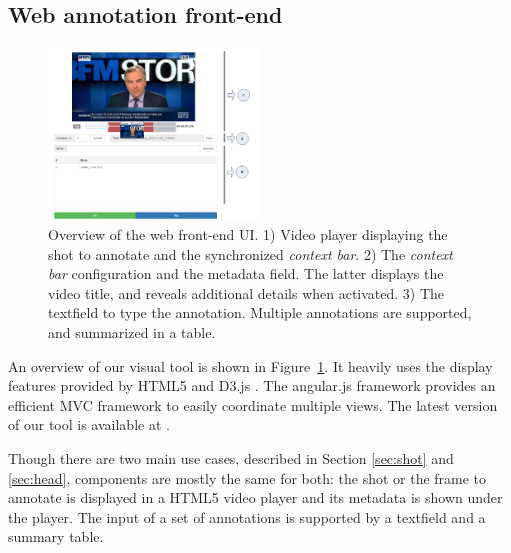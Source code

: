 \documentclass[a4paper]{article}
\begin{document}
      \subsection{Web annotation front-end}

\begin{figure}[h]
 	\includegraphics[width=0.5\textwidth]{camomile_ui.png}
	\caption{Overview of the web front-end UI. 1) Video player displaying the shot to annotate and the synchronized \emph{context bar}. 2) The \emph{context bar} configuration and the metadata field. The latter displays the video title, and reveals additional details when activated. 3) The textfield to type the annotation. Multiple annotations are supported, and summarized in a table.}
	\label{fig:frontend}

\end{figure}


An overview of our visual tool is shown in Figure~\ref{fig:frontend}. It heavily uses the display features provided by HTML5 and D3.js \cite{d3js}. The angular.js framework \cite{angularjs} provides an efficient MVC framework to easily coordinate multiple views. The latest version of our tool is available at \cite{urlfrontend}.



Though there are two main use cases, described in Section \ref{sec:shot} and \ref{sec:head}, components are mostly the same for both: the shot or the frame to annotate is displayed in a HTML5 video player and its metadata is shown under the player. The input of a set of annotations is supported by a textfield and a summary table.\\
\end{document}
